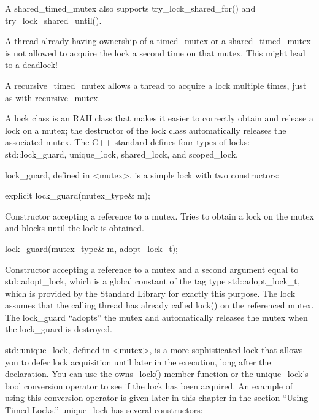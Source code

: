 A shared\_timed\_mutex also supports try\_lock\_shared\_for() and try\_lock\_shared\_until().

A thread already having ownership of a timed\_mutex or a shared\_timed\_mutex is not allowed to acquire the lock a second time on that mutex. This might lead to a deadlock!

A recursive\_timed\_mutex allows a thread to acquire a lock multiple times, just as with recursive\_mutex.


A lock class is an RAII class that makes it easier to correctly obtain and release a lock on a mutex; the destructor of the lock class automatically releases the associated mutex. The C++ standard defines four types of locks: std::lock\_guard, unique\_lock, shared\_lock, and scoped\_lock.


lock\_guard, defined in <mutex>, is a simple lock with two constructors:

\begin{cpp}
explicit lock_guard(mutex_type& m);
\end{cpp}

Constructor accepting a reference to a mutex. Tries to obtain a lock on the mutex and blocks until the lock is obtained.

\begin{cpp}
lock_guard(mutex_type& m, adopt_lock_t);
\end{cpp}

Constructor accepting a reference to a mutex and a second argument equal to std::adopt\_lock, which is a global constant of the tag type std::adopt\_lock\_t, which is provided by the Standard Library for exactly this purpose. The lock assumes that the calling thread has already called lock() on the referenced mutex. The lock\_guard “adopts” the mutex and automatically releases the mutex when the lock\_guard is destroyed.



std::unique\_lock, defined in <mutex>, is a more sophisticated lock that allows you to defer lock acquisition until later in the execution, long after the declaration. You can use the owns\_lock() member function or the unique\_lock’s bool conversion operator to see if the lock has been acquired. An example of using this conversion operator is given later in this chapter in the section “Using Timed Locks.” unique\_lock has several constructors:

